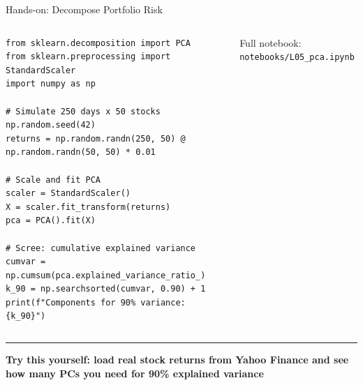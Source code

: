 \documentclass[8pt,aspectratio=169]{beamer}
\newcommand{\bottomnote}[1]{%
\vfill
\vspace{-2mm}
\textcolor{mllavender2}{\rule{\textwidth}{0.4pt}}
\vspace{1mm}
\footnotesize
\textbf{#1}
}
\begin{document}
\begin{frame}[fragile,t]{Hands-on: Decompose Portfolio Risk}
\begin{columns}[T]
\small

\vspace{2mm}
\begin{verbatim}
from sklearn.decomposition import PCA
from sklearn.preprocessing import StandardScaler
import numpy as np

# Simulate 250 days x 50 stocks
np.random.seed(42)
returns = np.random.randn(250, 50) @ np.random.randn(50, 50) * 0.01

# Scale and fit PCA
scaler = StandardScaler()
X = scaler.fit_transform(returns)
pca = PCA().fit(X)

# Scree: cumulative explained variance
cumvar = np.cumsum(pca.explained_variance_ratio_)
k_90 = np.searchsorted(cumvar, 0.90) + 1
print(f"Components for 90% variance: {k_90}")
\end{verbatim}

\vspace{1mm}
\scriptsize Full notebook: \texttt{notebooks/L05\_pca.ipynb}
\end{columns}

\bottomnote{Try this yourself: load real stock returns from Yahoo Finance and see how many PCs you need for 90\% explained variance}
\end{frame}
\end{document}
